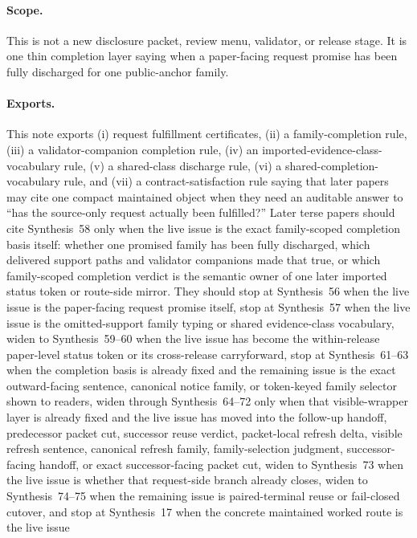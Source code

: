 \documentclass[11pt]{article}
\begin{document}
\paragraph{Scope.}
This is not a new disclosure packet, review menu, validator, or release stage.
It is one thin completion layer saying when a paper-facing request promise has been fully discharged for one public-anchor family.

\paragraph{Exports.}
This note exports (i) request fulfillment certificates, (ii) a family-completion rule, (iii) a validator-companion completion rule, (iv) an imported-evidence-class-vocabulary rule, (v) a shared-class discharge rule, (vi) a shared-completion-vocabulary rule, and (vii) a contract-satisfaction rule saying that later papers may cite one compact maintained object when they need an auditable answer to ``has the source-only request actually been fulfilled?'' Later terse papers should cite Synthesis~58 only when the live issue is the exact family-scoped completion basis itself: whether one promised family has been fully discharged, which delivered support paths and validator companions made that true, or which family-scoped completion verdict is the semantic owner of one later imported status token or route-side mirror. They should stop at Synthesis~56 when the live issue is the paper-facing request promise itself, stop at Synthesis~57 when the live issue is the omitted-support family typing or shared evidence-class vocabulary, widen to Synthesis~59--60 when the live issue has become the within-release paper-level status token or its cross-release carryforward, stop at Synthesis~61--63 when the completion basis is already fixed and the remaining issue is the exact outward-facing sentence, canonical notice family, or token-keyed family selector shown to readers, widen through Synthesis~64--72 only when that visible-wrapper layer is already fixed and the live issue has moved into the follow-up handoff, predecessor packet cut, successor reuse verdict, packet-local refresh delta, visible refresh sentence, canonical refresh family, family-selection judgment, successor-facing handoff, or exact successor-facing packet cut, widen to Synthesis~73 when the live issue is whether that request-side branch already closes, widen to Synthesis~74--75 when the remaining issue is paired-terminal reuse or fail-closed cutover, and stop at Synthesis~17 when the concrete maintained worked route is the live issue 
\end{document}
